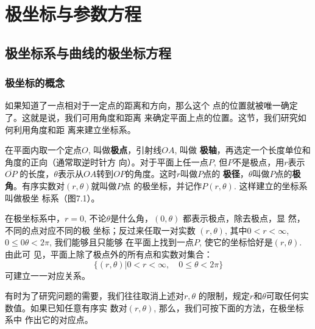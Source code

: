 
\chapter{极坐标与参数方程}

\section{极坐标系与曲线的极坐标方程}
\subsection{极坐标的概念}

如果知道了一点相对于一定点的距离和方向，那么这个
点的位置就被唯一确定了。这就是说，我们可用角度和距离
来确定平面上点的位置。这节，我们研究如何利用角度和距
离来建立坐标系。

在平面内取一个定点$O$, 叫做\textbf{极点}，引射线$OA$, 叫做
\textbf{极轴}，再选定一个长度单位和角度的正向（通常取逆时针方
向）。对于平面上任一点$P$, 但$P$不是极点，用$r$表示$\overline{OP}$
的长度，$\theta$表示从$OA$转到$OP$的角度。这时$r$叫做$P$点的
\textbf{极径}，$\theta$叫做$P$点的\textbf{极角}。有序实数对$(r,\theta)$就叫做$P$点
的极坐标，并记作$P(r,\theta)$. 这样建立的坐标系叫做极坐
标系（图7.1）。

在极坐标系中，$r=0$,
不论$\theta$是什么角，$(0,\theta)$
都表示极点，除去极点，显
然，不同的点对应不同的极
坐标；反过来任取一对实数
$(r,\theta)$, 其中$0<r<\infty$, $0\le 0\theta<2\pi$, 我们能够且只能够
在平面上找到一点$P$, 使它的坐标恰好是$(r,\theta)$. 由此可
见，平面上除了极点外的所有点和实数对集合：
\[\{(r,\theta)|0<r<\infty,\quad 0\le\theta<2\pi\}\]
可建立一一对应关系。

有时为了研究问题的需要，我们往往取消上述对$r,\theta$
的限制，规定$r$和$\theta$可取任何实数值。如果已知任意有序实
数对$(r,\theta)$, 那么，我们可按下面的方法，在极坐标系中
作出它的对应点。

\begin{figure}[htp]\centering
    \begin{minipage}[t]{0.48\textwidth}
    \centering
{}
    \caption{}
    \end{minipage}
    \begin{minipage}[t]{0.48\textwidth}
    \centering
    \caption{}
    \end{minipage}
    \end{figure}


